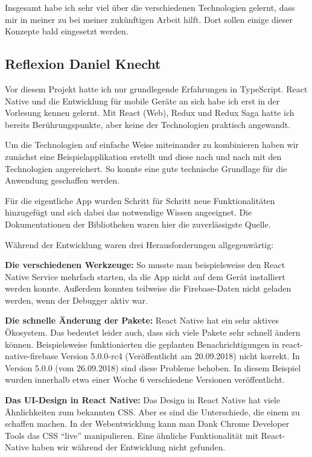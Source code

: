 Insgesamt habe ich sehr viel über die verschiedenen Technologien gelernt, dass mir in meiner zu bei meiner zukünftigen Arbeit hilft.
Dort sollen einige dieser Konzepte bald eingesetzt werden.

\subsection{Reflexion Daniel Knecht}
Vor diesem Projekt hatte ich nur grundlegende Erfahrungen in TypeScript.
React Native und die Entwicklung  für mobile Geräte an sich habe ich erst in der Vorlesung kennen gelernt.
Mit React (Web), Redux und Redux Saga hatte ich bereits Berührungspunkte,
aber keine der Technologien praktisch angewandt.

Um die Technologien auf einfache Weise miteinander zu kombinieren haben wir zunächst eine
Beispielapplikation erstellt und diese nach und nach mit den Technologien angereichert.
So konnte eine gute technische Grundlage für die Anwendung geschaffen werden.

Für die eigentliche App wurden Schritt für Schritt neue Funktionalitäten hinzugefügt
und sich dabei das notwendige Wissen angeeignet.
Die Dokumentationen der Bibliotheken waren hier die zuverlässigste Quelle.

Während der Entwicklung waren drei Herausforderungen allgegenwärtig:

\textbf{Die verschiedenen Werkzeuge:}
So musste man beispielsweise den React Native Service mehrfach starten,
da die App nicht auf dem Gerät installiert werden konnte.
Außerdem konnten teilweise die Firebase-Daten nicht geladen werden,
wenn der Debugger aktiv war.

\textbf{Die schnelle Änderung der Pakete:}
React Native hat ein sehr aktives Ökosystem.
Das bedeutet leider auch,
dass sich viele Pakete sehr schnell ändern können.
Beispielsweise funktionierten die geplanten Benachrichtigungen in react-native-firebase Version 5.0.0-rc4 (Veröffentlicht am 20.09.2018) nicht korrekt.
In Version 5.0.0 (vom 26.09.2018) sind diese Probleme behoben. In diesem Beispiel wurden innerhalb etwa einer Woche 6 verschiedene Versionen veröffentlicht.

\textbf{Das UI-Design in React Native:}
Das Design in React Native hat viele Ähnlichkeiten zum bekannten CSS.
Aber es sind die Unterschiede, die einem zu schaffen machen.
In der Webentwicklung kann man Dank Chrome Developer Tools das CSS \enquote{live} manipulieren.
Eine ähnliche Funktionalität mit React-Native haben wir während der Entwicklung nicht gefunden.

